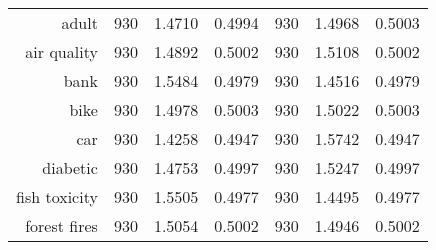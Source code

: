 \begin{table}[htbp]
{\begin{tabular}{rcccccc}
			adult                              & 930                                        & \cellcolor[rgb]{ .776,  .937,  .808}\textcolor[rgb]{ 0,  .38,  0}{1.4710}          & 0.4994          & 930                               & 1.4968                                                                    & 0.5003          \\
			air quality                        & 930                                        & \cellcolor[rgb]{ .776,  .937,  .808}\textcolor[rgb]{ 0,  .38,  0}{1.4892}          & 0.5002          & 930                               & 1.5108                                                                    & 0.5002          \\
			bank                               & 930                                        & 1.5484                                                                             & 0.4979          & 930                               & \cellcolor[rgb]{ .776,  .937,  .808}\textcolor[rgb]{ 0,  .38,  0}{1.4516} & 0.4979          \\
			bike                               & 930                                        & \cellcolor[rgb]{ .776,  .937,  .808}\textcolor[rgb]{ 0,  .38,  0}{1.4978}          & 0.5003          & 930                               & 1.5022                                                                    & 0.5003          \\
			car                                & 930                                        & \cellcolor[rgb]{ .776,  .937,  .808}\textcolor[rgb]{ 0,  .38,  0}{1.4258}          & 0.4947          & 930                               & 1.5742                                                                    & 0.4947          \\
			diabetic                           & 930                                        & \cellcolor[rgb]{ .776,  .937,  .808}\textcolor[rgb]{ 0,  .38,  0}{1.4753}          & 0.4997          & 930                               & 1.5247                                                                    & 0.4997          \\
			fish toxicity                      & 930                                        & 1.5505                                                                             & 0.4977          & 930                               & \cellcolor[rgb]{ .776,  .937,  .808}\textcolor[rgb]{ 0,  .38,  0}{1.4495} & 0.4977          \\
			forest fires                       & 930                                        & 1.5054                                                                             & 0.5002          & 930                               & \cellcolor[rgb]{ .776,  .937,  .808}\textcolor[rgb]{ 0,  .38,  0}{1.4946} & 0.5002          \\

\end{tabular}}
\end{table}
